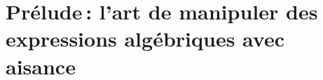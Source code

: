 \documentclass[ twoside,openright,titlepage,numbers=noenddot,%
                headinclude,footinclude,cleardoublepage=empty,abstract=on,
                BCOR=5mm,paper=a4,fontsize=11pt
                ]{scrreprt}
\begin{document}
\frenchspacing
\raggedbottom
{}
\pagestyle{plain}





\cleardoublepage
\thispagestyle{empty}
\vfill
\cleardoublepage



\pagestyle{scrheadings}

\setcounter{tocdepth}{2} %
\setcounter{secnumdepth}{3} %
\manualmark
\markboth{\spacedlowsmallcaps{\contentsname}}{\spacedlowsmallcaps{\contentsname}}
\tableofcontents
{}
\renewcommand{\chaptermark}[1]{\markboth{\spacedlowsmallcaps{#1}}{\spacedlowsmallcaps{#1}}}
\renewcommand{\sectionmark}[1]{\markright{\textsc{\thesection}\enspace\spacedlowsmallcaps{#1}}}

\vfill

\pagebreak

\phantom{test}
\pagebreak


\pagestyle{scrheadings}





\part{Prélude\,: l'art de manipuler des expressions algébriques avec aisance}\label{part_1}




% 

\iffalse
\end{document}
